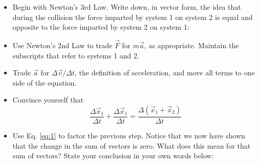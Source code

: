\documentclass{article}
\begin{document}
\begin{itemize}
\item Begin with Newton's 3rd Law.  Write down, in vector form, the idea that during the collision the force imparted by system 1 on system 2 is equal and opposite to the force imparted by system 2 on system 1: \\ \vspace{0.5cm}
\item Use Newton's 2nd Law to trade $\vec{F}$ for $m\vec{a}$, as appropriate.  Maintain the subscripts that refer to systems 1 and 2. \\ \vspace{0.5cm}
\item Trade $\vec{a}$ for $\Delta\vec{v}/\Delta t$, the definition of acceleration, and move all terms to one side of the equation. \\ \vspace{0.5cm}
\item Convince yourself that
\begin{equation}
\frac{\Delta\vec{x}_1}{\Delta t} + \frac{\Delta\vec{x}_1}{\Delta t} = \frac{\Delta\left(\vec{x}_1 + \vec{x}_2\right)}{\Delta t} \label{eq:1}
\end{equation}
\item Use Eq. \ref{eq:1} to factor the previous step.  Notice that we now have shown that the change in the sum of vectors is zero.  What does this mean for that sum of vectors?  State your conclusion in your own words below:
\end{itemize}
\end{document}
